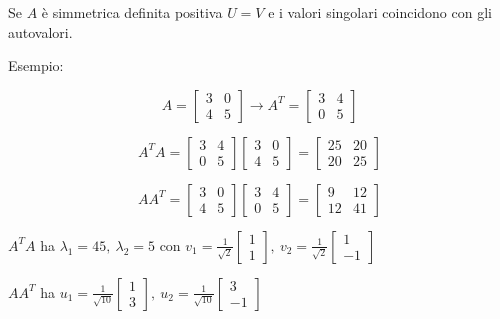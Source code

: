 \documentclass{article}
\begin{document}
Se \(A\) è simmetrica definita positiva $U=V$ e i valori singolari coincidono con gli autovalori.\newpage

Esempio:

\[
A=
\begin{bmatrix}
3 & 0\\
4 & 5
\end{bmatrix}\rightarrow
A^T=
\begin{bmatrix}
3 & 4\\
0 & 5
\end{bmatrix}
\]

\vspace{5pt}

\[
A^T A=
\begin{bmatrix}
3 & 4\\
0 & 5
\end{bmatrix}
\begin{bmatrix}
3 & 0\\
4 & 5
\end{bmatrix}
=
\begin{bmatrix}
25 & 20\\
20 & 25
\end{bmatrix}
\]

\vspace{5pt}

\[
A A^T=
\begin{bmatrix}
3 & 0\\
4 & 5
\end{bmatrix}
\begin{bmatrix}
3 & 4\\
0 & 5
\end{bmatrix}
=
\begin{bmatrix}
9 & 12\\
12 & 41
\end{bmatrix}
\]

\vspace{5pt}

\(A^T A\) ha $\lambda_1=45,
\
\lambda_2=5
$ con $v_1=\frac{1}{\sqrt2}
\begin{bmatrix}
1\\
1
\end{bmatrix},
\
v_2=\frac{1}{\sqrt2}
\begin{bmatrix}
1\\
-1
\end{bmatrix}$

\vspace{5pt}

\(A A^T\) ha $
u_1=
\frac{1}{\sqrt{10}}
\begin{bmatrix}
1\\
3
\end{bmatrix},
\
u_2=
\frac{1}{\sqrt{10}}
\begin{bmatrix}
3\\
-1
\end{bmatrix}
$
\end{document}
